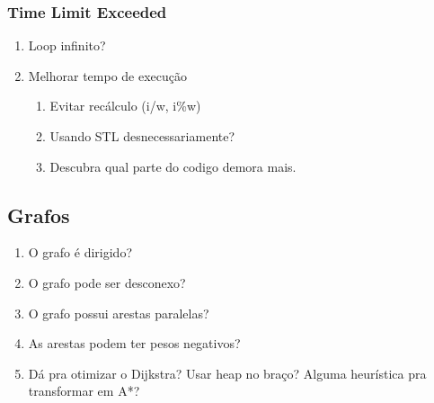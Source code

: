 \documentclass[12pt,a4paper]{article}
\begin{document}
			\subsubsection{Time Limit Exceeded}
				\begin{enumerate}
					\item Loop infinito?
					\item Melhorar tempo de execução
					\begin{enumerate}
						\item Evitar recálculo (i/w, i\%w)
						\item Usando STL desnecessariamente?
						\item Descubra qual parte do codigo demora mais.
					\end{enumerate}
				\end{enumerate}
		\subsection{Grafos}
			\begin{enumerate}
				\item O grafo é dirigido?
				\item O grafo pode ser desconexo?
				\item O grafo possui arestas paralelas?
				\item As arestas podem ter pesos negativos?
				\item Dá pra otimizar o Dijkstra? Usar heap no braço? Alguma heurística pra transformar em A*?
			\end{enumerate}
\end{document}
